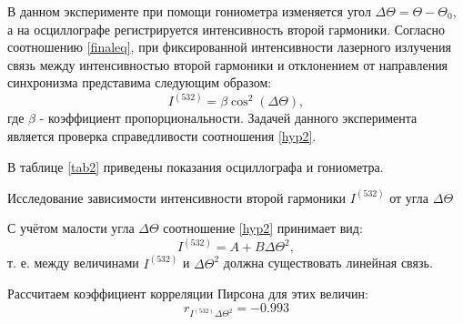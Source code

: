 \documentclass[12pt]{article}
\begin{document}
\hspace{0.5cm}
В данном эксперименте при помощи гониометра изменяется угол $\Delta \Theta = \Theta - \Theta_0$, а на осциллографе регистрируется интенсивность второй гармоники. Согласно соотношению \ref{finaleq}, при фиксированной интенсивности лазерного излучения связь между интенсивностью второй гармоники и отклонением от направления синхронизма представима следующим образом:
\begin{equation}
\label{hyp2}
I^{(532)} = \beta \cos^2{(\Delta \Theta)},
\end{equation}
где $\beta$ - коэффициент пропорциональности. Задачей данного эксперимента является проверка справедливости соотношения \ref{hyp2}.

В таблице \ref{tab2} приведены показания осциллографа и гониометра.

\begin{table}[h!]
\begin{center}
\caption{Исследование зависимости интенсивности второй гармоники $I^{(532)}$ от угла $\Delta \Theta$}
\label{tab2}
\end{center}
\end{table}

С учётом малости угла $\Delta \Theta$ соотношение \ref{hyp2} принимает вид:
\begin{equation}
\label{hyp2sub}
I^{(532)} = A + B\Delta \Theta ^2,
\end{equation}
т. е. между величинами $I^{(532)}$ и $\Delta \Theta ^2$ должна существовать линейная связь.

Рассчитаем коэффициент корреляции Пирсона для этих величин:
\begin{equation}
r_{I^{(532)}\Delta \Theta ^2} = -0.993
\end{equation}
\end{document}
